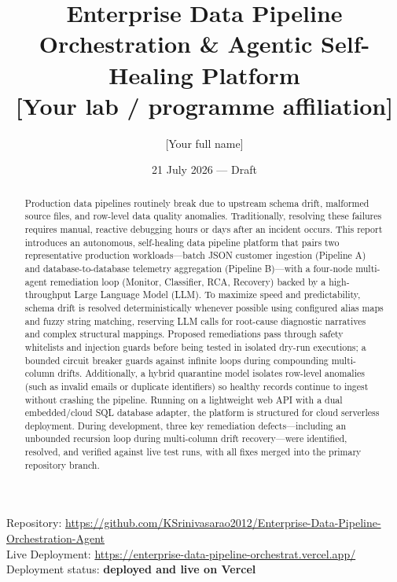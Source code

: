\documentclass[11pt]{article}
\title{Enterprise Data Pipeline Orchestration \& Agentic Self-Healing Platform \\[6pt]
  \large [Your lab / programme affiliation]}
\author{[Your full name]}
\date{21 July 2026 --- Draft}
\begin{document}
\maketitle

\begin{center}
\small
Repository: \url{https://github.com/KSrinivasarao2012/Enterprise-Data-Pipeline-Orchestration-Agent} \\
Live Deployment: \url{https://enterprise-data-pipeline-orchestrat.vercel.app/} \\
Deployment status: \textbf{deployed and live on Vercel}
\end{center}

\vspace{6pt}

\begin{abstract}
Production data pipelines routinely break due to upstream schema drift, malformed source files, and row-level data quality anomalies. Traditionally, resolving these failures requires manual, reactive debugging hours or days after an incident occurs. This report introduces an autonomous, self-healing data pipeline platform that pairs two representative production workloads—batch JSON customer ingestion (Pipeline A) and database-to-database telemetry aggregation (Pipeline B)—with a four-node multi-agent remediation loop (Monitor, Classifier, RCA, Recovery) backed by a high-throughput Large Language Model (LLM). To maximize speed and predictability, schema drift is resolved deterministically whenever possible using configured alias maps and fuzzy string matching, reserving LLM calls for root-cause diagnostic narratives and complex structural mappings. Proposed remediations pass through safety whitelists and injection guards before being tested in isolated dry-run executions; a bounded circuit breaker guards against infinite loops during compounding multi-column drifts. Additionally, a hybrid quarantine model isolates row-level anomalies (such as invalid emails or duplicate identifiers) so healthy records continue to ingest without crashing the pipeline. Running on a lightweight web API with a dual embedded/cloud SQL database adapter, the platform is structured for cloud serverless deployment. During development, three key remediation defects—including an unbounded recursion loop during multi-column drift recovery—were identified, resolved, and verified against live test runs, with all fixes merged into the primary repository branch.
\end{abstract}

\end{document}
